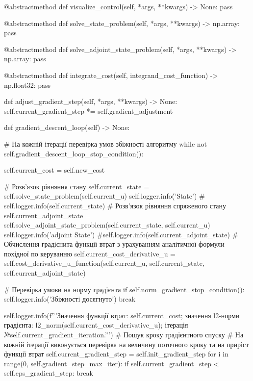 \documentclass[a4paper,12pt]{extreport}
\begin{document}
\begin{python}[utf8]
        @abstractmethod
        def visualize_control(self, *args, **kwargs) -> None:
            pass
    
        @abstractmethod
        def solve_state_problem(self,  *args, **kwargs) -> np.array:
            pass
    
        @abstractmethod
        def solve_adjoint_state_problem(self, *args, **kwargs) -> np.array:
            pass
    
        @abstractmethod
        def integrate_cost(self, integrand_cost_function) -> np.float32:
            pass
    
        def adjust_gradient_step(self, *args, **kwargs) -> None:
            self.current_gradient_step *= self.gradient_adjustment
    
        def gradient_descent_loop(self) -> None:
    
            # На кожній ітерації перевірка умов збіжності алгоритму
            while not self.gradient_descent_loop_stop_condition():
    
                self.current_cost = self.new_cost
    
                # Розв'язок рівняння стану
                self.current_state = self.solve_state_problem(self.current_u)
                self.logger.info('State')
               # self.logger.info(self.current_state)
                # Розв'язок рівняння спряженого стану
                self.current_adjoint_state = self.solve_adjoint_state_problem(self.current_state, self.current_u)
                self.logger.info('adjoint State')
                #self.logger.info(self.current_adjoint_state)
                # Обчислення градієнита функції втрат з урахуванням аналітичної формули похідної по керуванню
                self.current_cost_derivative_u = self.cost_derivative_u_function(self.current_u, self.current_state,
                                                                                 self.current_adjoint_state)
    
                # Перевірка умови на норму градієнта
                if self.norm_gradient_stop_condition():
                    self.logger.info('Збіжності досягнуто')
                    break
    
                self.logger.info(f'''Значення функції втрат: {self.current_cost}; 
                                    значення l2-норми градієнта: {l2_norm(self.current_cost_derivative_u)};
                                    ітерація №{self.current_gradient_iteration}.''')
                # Пошук кроку градієнтного спуску
                # На кожній ітерації виконується перевірка на величину поточного кроку та на приріст функції втрат
                self.current_gradient_step = self.init_gradient_step
                for i in range(0, self.gradient_step_max_iter):
                    if self.current_gradient_step < self.eps_gradient_step:
                        break
    

\end{python}
\end{document}
